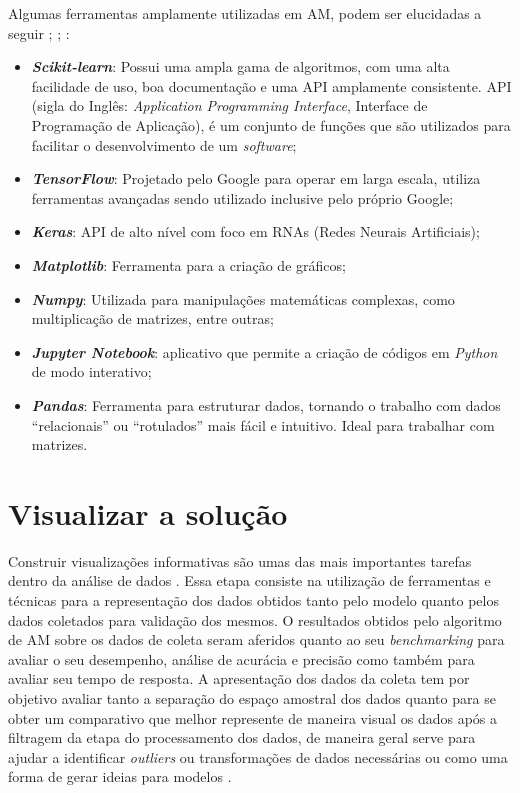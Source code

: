 Algumas ferramentas amplamente utilizadas em AM, podem ser elucidadas a seguir \cite{scikitlearn}; \cite{abadi2016tensorflow}; \cite{McKinney2012datapython}:
\begin{itemize}
    \item \textbf{\textit{Scikit-learn}}: Possui uma ampla gama de algoritmos, com uma alta facilidade de uso, boa documentação e uma API amplamente consistente. API (sigla do Inglês: \textit{Application Programming Interface}, Interface de Programação de Aplicação), é um conjunto de funções que são utilizados para facilitar o desenvolvimento de um \textit{software};
    \item \textbf{\textit{TensorFlow}}: Projetado pelo Google para operar em larga escala, utiliza ferramentas avançadas sendo utilizado inclusive pelo próprio Google;
    \item \textbf{\textit{Keras}}: API de alto nível com foco em RNAs (Redes Neurais Artificiais);
    \item \textbf{\textit{Matplotlib}}: Ferramenta para a criação de gráficos;
    \item \textbf{\textit{Numpy}}: Utilizada para manipulações matemáticas complexas, como multiplicação de matrizes, entre outras;
    \item \textbf{\textit{Jupyter Notebook}}: aplicativo que permite a criação de códigos em \textit{Python} de modo interativo;
    \item \textbf{\textit{Pandas}}: Ferramenta para estruturar dados, tornando o trabalho com dados “relacionais” ou “rotulados” mais fácil e intuitivo. Ideal para trabalhar com matrizes.
\end{itemize}

\section{Visualizar a solução}
Construir visualizações informativas são umas das mais importantes tarefas dentro da análise de dados \cite{McKinney2012datapython}. Essa etapa consiste na utilização de ferramentas e técnicas para a representação dos dados obtidos tanto pelo modelo quanto pelos dados coletados para validação dos mesmos. O resultados obtidos pelo algoritmo de AM sobre os dados de coleta seram aferidos quanto ao seu \textit{benchmarking} \cite{Benchmarking} para avaliar o seu desempenho, análise de acurácia e precisão como também para avaliar seu tempo de resposta. A apresentação dos dados da coleta tem por objetivo avaliar tanto a separação do espaço amostral dos dados quanto para se obter um comparativo que melhor represente de maneira visual os dados após a filtragem da etapa do processamento dos dados, de maneira geral serve para ajudar a identificar \textit{outliers} ou transformações de dados necessárias ou como uma forma de gerar ideias para modelos \cite{McKinney2012datapython}.

